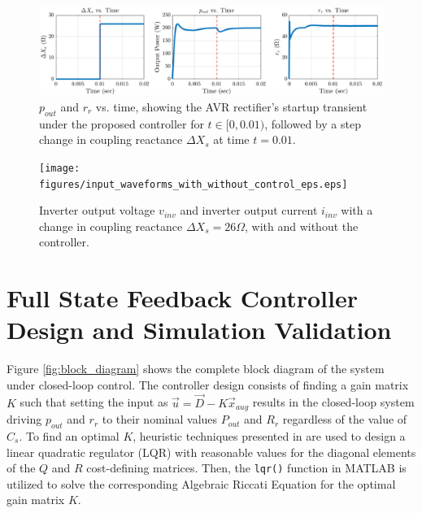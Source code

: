 \documentclass[conference, twocolumn, letterpaper]{IEEEtran}
\begin{document}
\vspace{0.5cm}

\begin{figure}[!t]
	\vspace{-0.2cm}
	\centering
	\includegraphics[width=\textwidth]{figures/pout_zin_with_disturbance_eps.eps}
	\caption{$p_{out}$ and $r_r$ vs. time, showing the AVR rectifier's startup transient under the proposed controller for $t \in [0, 0.01)$, followed by a step change in coupling reactance $\Delta X_s$ at time $t = 0.01$.}
	\label{fig:step_response}
\end{figure}

\begin{figure}[!t]
	\centering
	\texttt{[image: figures/input\_waveforms\_with\_without\_control\_eps.eps]}
	\caption{Inverter output voltage $v_{inv}$ and inverter output current $i_{inv}$ with a change in coupling reactance $\Delta X_s = 26 \Omega$, with and without the controller.}
	\label{fig:input_waveforms}
\end{figure}

\vspace{-1cm}

\section{Full State Feedback Controller Design and Simulation Validation}
\label{sec:control}

Figure \ref{fig:block_diagram} shows the complete block diagram of the system under closed-loop control. The controller design consists of finding a gain matrix $K$ such that setting the input as $\vec{u} = \vec{D} - K\vec{x}_{aug}$ results in the closed-loop system driving $p_{out}$ and $r_r$ to their nominal values $P_{out}$ and $R_r$ regardless of the value of $C_s$. To find an optimal $K$, heuristic techniques presented in \cite{2007_Williams} are used to design a linear quadratic regulator (LQR) with reasonable values for the diagonal elements of the $Q$ and $R$ cost-defining matrices. Then, the \texttt{lqr()} function in MATLAB is utilized to solve the corresponding Algebraic Riccati Equation for the optimal gain matrix $K$.
\end{document}
